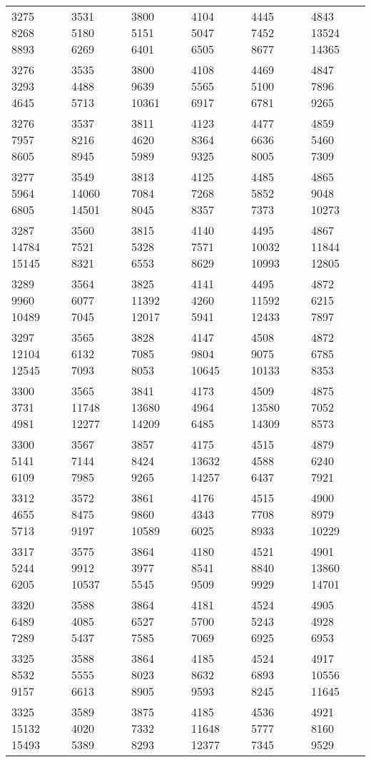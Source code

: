 \begin{center}
\begin{longtable}[c]{llllll}
3275 8268 8893&3531 5180 6269&3800 5151 6401&4104 5047 6505&4445 7452 8677&4843 13524 14365\\
3276 3293 4645&3535 4488 5713&3800 9639 10361&4108 5565 6917&4469 5100 6781&4847 7896 9265\\
3276 7957 8605&3537 8216 8945&3811 4620 5989&4123 8364 9325&4477 6636 8005&4859 5460 7309\\
3277 5964 6805&3549 14060 14501&3813 7084 8045&4125 7268 8357&4485 5852 7373&4865 9048 10273\\
3287 14784 15145&3560 7521 8321&3815 5328 6553&4140 7571 8629&4495 10032 10993&4867 11844 12805\\
3289 9960 10489&3564 6077 7045&3825 11392 12017&4141 4260 5941&4495 11592 12433&4872 6215 7897\\
3297 12104 12545&3565 6132 7093&3828 7085 8053&4147 9804 10645&4508 9075 10133&4872 6785 8353\\
3300 3731 4981&3565 11748 12277&3841 13680 14209&4173 4964 6485&4509 13580 14309&4875 7052 8573\\
3300 5141 6109&3567 7144 7985&3857 8424 9265&4175 13632 14257&4515 4588 6437&4879 6240 7921\\
3312 4655 5713&3572 8475 9197&3861 9860 10589&4176 4343 6025&4515 7708 8933&4900 8979 10229\\
3317 5244 6205&3575 9912 10537&3864 3977 5545&4180 8541 9509&4521 8840 9929&4901 13860 14701\\
3320 6489 7289&3588 4085 5437&3864 6527 7585&4181 5700 7069&4524 5243 6925&4905 4928 6953\\
3325 8532 9157&3588 5555 6613&3864 8023 8905&4185 8632 9593&4524 6893 8245&4917 10556 11645\\
3325 15132 15493&3589 4020 5389&3875 7332 8293&4185 11648 12377&4536 5777 7345&4921 8160 9529\\
\end{longtable}
\end{center}
